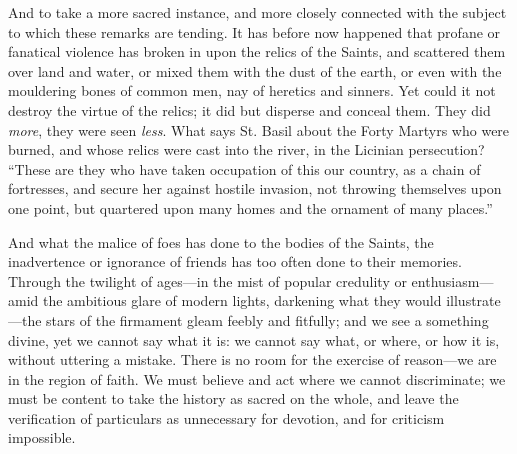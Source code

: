 And to take a more sacred instance, and more
closely connected with the subject to which these remarks are tending.
It has before now happened that profane or fanatical violence has
broken in upon the relics of the Saints, and scattered them over land
and water, or mixed them with the dust of the earth, or even with the
mouldering bones of common men, nay of heretics and sinners. Yet could
it not destroy the virtue of the relics; it did but disperse and
conceal them. They did \emph{more}, they were seen \emph{less}. What
says St. Basil about the Forty Martyrs who were burned, and whose
relics were cast into the river, in the Licinian persecution? ``These
are they who have taken occupation of this our country, as a chain of
fortresses, and secure her against hostile invasion, not throwing
themselves upon one point, but quartered upon many homes and the
ornament of many places.''

And what the malice of foes has done to the bodies of the Saints, the inadvertence or ignorance of friends has too
often done to their memories. Through the twilight of ages—in the
mist of popular credulity or enthusiasm—amid the ambitious glare of
modern lights, darkening what they would illustrate—the stars of the
firmament gleam feebly and fitfully; and we see a something divine,
yet we cannot say what it is: we cannot say what, or where, or how it
is, without uttering a mistake. There is no room for the exercise of
reason—we are in the region of faith. We must believe and act where
we cannot discriminate; we must be content to take the history as
sacred on the whole, and leave the verification of particulars as
unnecessary for devotion, and for criticism impossible.

